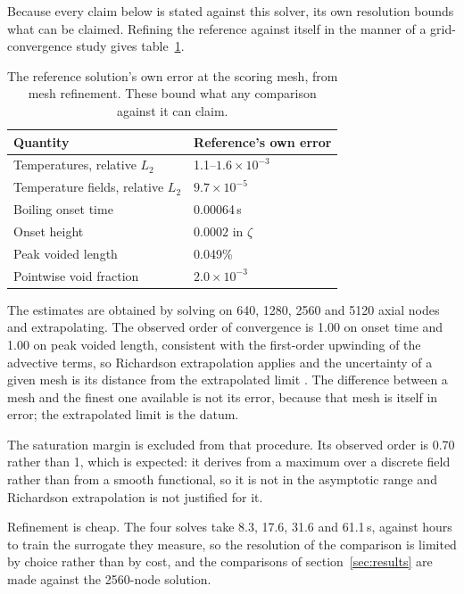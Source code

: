 \documentclass[11pt,a4paper]{article}
\begin{document}
Because every claim below is stated against this solver, its own resolution bounds what can
be claimed. Refining the reference against itself in the manner of a grid-convergence study
\cite{eca} gives table~\ref{tab:ruler}.

\begin{table}[tbp]
\caption{The reference solution's own error at the scoring mesh, from mesh refinement.
These bound what any comparison against it can claim.}
\label{tab:ruler}
\centering
\begin{tabular}{@{}ll@{}}
\toprule
Quantity & Reference's own error \\
\midrule
Temperatures, relative $L_2$ & 1.1--$1.6\times10^{-3}$ \\
Temperature fields, relative $L_2$ & $9.7\times10^{-5}$ \\
Boiling onset time           & 0.00064\,s \\
Onset height                 & $0.0002$ in $\zeta$ \\
Peak voided length           & 0.049\% \\
Pointwise void fraction      & $2.0\times10^{-3}$ \\
\bottomrule
\end{tabular}
\end{table}

The estimates are obtained by solving on 640, 1280, 2560 and 5120 axial nodes and
extrapolating. The observed order of convergence is 1.00 on onset time and 1.00 on peak
voided length, consistent with the first-order upwinding of the advective terms, so
Richardson extrapolation applies and the uncertainty of a given mesh is its distance from
the extrapolated limit \cite{eca}. The difference between a mesh and the finest one
available is not its error, because that mesh is itself in error; the extrapolated limit is
the datum.

The saturation margin is excluded from that procedure. Its observed order is 0.70 rather
than 1, which is expected: it derives from a maximum over a discrete field rather than from
a smooth functional, so it is not in the asymptotic range and Richardson extrapolation is
not justified for it.

Refinement is cheap. The four solves take 8.3, 17.6, 31.6 and 61.1\,s, against hours to
train the surrogate they measure, so the resolution of the comparison is limited by choice
rather than by cost, and the comparisons of section~\ref{sec:results} are made against
the 2560-node solution.
\end{document}
